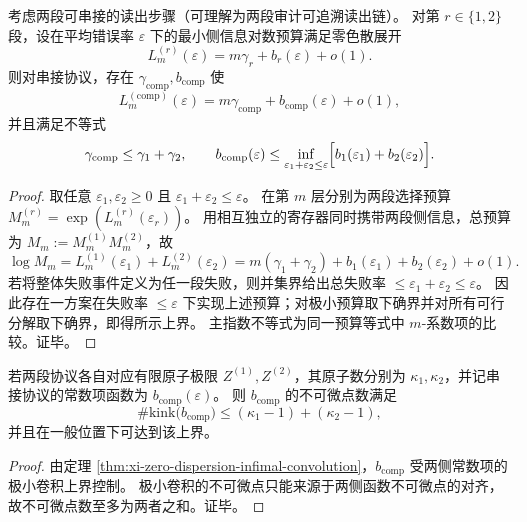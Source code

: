 \begin{theorem}\label{thm:xi-zero-dispersion-infimal-convolution}
考虑两段可串接的读出步骤（可理解为两段审计可追溯读出链）。
对第 \(r\in\{1,2\}\) 段，设在平均错误率 \(\varepsilon\) 下的最小侧信息对数预算满足零色散展开
\[
L^{(r)}_m(\varepsilon)=m\gamma_r+b_r(\varepsilon)+o(1).
\]
则对串接协议，存在 \(\gamma_{\mathrm{comp}},b_{\mathrm{comp}}\) 使
\[
L^{(\mathrm{comp})}_m(\varepsilon)=m\gamma_{\mathrm{comp}}+b_{\mathrm{comp}}(\varepsilon)+o(1),
\]
并且满足不等式
\[
\gamma_{\mathrm{comp}}\le \gamma_1+\gamma_2,
\qquad
b_{\mathrm{comp}}(\varepsilon)\le
\inf_{\varepsilon_1+\varepsilon_2\le \varepsilon}\Bigl[b_1(\varepsilon_1)+b_2(\varepsilon_2)\Bigr].
\]
\end{theorem}
\begin{proof}
取任意 \(\varepsilon_1,\varepsilon_2\ge 0\) 且 \(\varepsilon_1+\varepsilon_2\le\varepsilon\)。
在第 \(m\) 层分别为两段选择预算
\(
M^{(r)}_m=\exp(L^{(r)}_m(\varepsilon_r))
\)。
用相互独立的寄存器同时携带两段侧信息，总预算为 \(M_m:=M^{(1)}_mM^{(2)}_m\)，故
\[
\log M_m=L^{(1)}_m(\varepsilon_1)+L^{(2)}_m(\varepsilon_2)
=m(\gamma_1+\gamma_2)+b_1(\varepsilon_1)+b_2(\varepsilon_2)+o(1).
\]
若将整体失败事件定义为任一段失败，则并集界给出总失败率 \(\le\varepsilon_1+\varepsilon_2\le\varepsilon\)。
因此存在一方案在失败率 \(\le\varepsilon\) 下实现上述预算；对极小预算取下确界并对所有可行分解取下确界，即得所示上界。
主指数不等式为同一预算等式中 \(m\)-系数项的比较。证毕。
\end{proof}

\begin{corollary}[有限原子零色散在串接下的折点数上界]\label{cor:xi-zero-dispersion-kink-count-under-composition}
若两段协议各自对应有限原子极限 \(Z^{(1)},Z^{(2)}\)，其原子数分别为 \(\kappa_1,\kappa_2\)，并记串接协议的常数项函数为 \(b_{\mathrm{comp}}(\varepsilon)\)。
则 \(b_{\mathrm{comp}}\) 的不可微点数满足
\[
\#\mathrm{kink}\bigl(b_{\mathrm{comp}}\bigr)\le (\kappa_1-1)+(\kappa_2-1),
\]
并且在一般位置下可达到该上界。
\end{corollary}
\begin{proof}
由定理 \ref{thm:xi-zero-dispersion-infimal-convolution}，\(b_{\mathrm{comp}}\) 受两侧常数项的极小卷积上界控制。
极小卷积的不可微点只能来源于两侧函数不可微点的对齐，故不可微点数至多为两者之和。证毕。
\end{proof}

